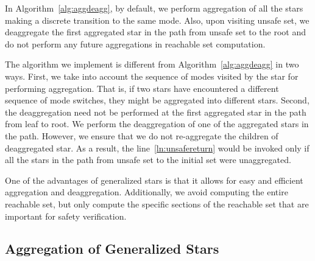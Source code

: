 \begin{remark}
\label{rem:aggonly}
In Algorithm~\ref{alg:aggdeagg}, by default, we perform aggregation of all the stars making a discrete transition to the same mode. Also, upon visiting unsafe set, we deaggregate the first aggregated star in the path from unsafe set to the root and do not perform any future aggregations in reachable set computation. 

The algorithm we implement is different from Algorithm~\ref{alg:aggdeagg} in two ways. First, we take into account the sequence of modes visited by the star for performing aggregation. That is, if two stars have encountered a different sequence of mode switches, they might be aggregated into different stars. Second, the deaggregation need not be performed at the first aggregated star in the path from leaf to root. We perform the deaggregation of one of the aggregated stars in the path. However, we ensure that we do not re-aggregate the children of deaggregated star. As a result, the line~\ref{ln:unsafereturn} would be invoked only if all the stars in the path from unsafe set to the initial set were unaggregated.
\end{remark}

One of the advantages of generalized stars is that it allows for easy and efficient aggregation and deaggregation. 
%
Additionally, we avoid computing the entire reachable set, but only compute the specific sections of the reachable set that are important for safety verification.
%
%
%
%




\subsection{Aggregation of Generalized Stars}
\label{sec:aggStars}

